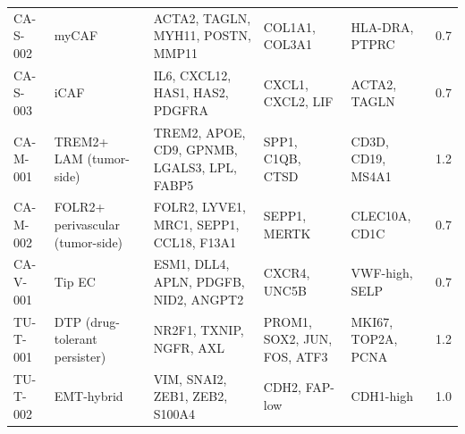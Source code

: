 \begin{longtable}{@{}l l p{42mm} p{38mm} p{34mm} l@{}}
CA-S-002 & myCAF                               & ACTA2, TAGLN, MYH11, POSTN, MMP11          & COL1A1, COL3A1                                 & HLA-DRA, PTPRC                                 & 0.7 \\
CA-S-003 & iCAF                                & IL6, CXCL12, HAS1, HAS2, PDGFRA            & CXCL1, CXCL2, LIF                              & ACTA2, TAGLN                                   & 0.7 \\
CA-M-001 & TREM2+ LAM (tumor-side)             & TREM2, APOE, CD9, GPNMB, LGALS3, LPL, FABP5 & SPP1, C1QB, CTSD                              & CD3D, CD19, MS4A1                              & 1.2 \\
CA-M-002 & FOLR2+ perivascular (tumor-side)    & FOLR2, LYVE1, MRC1, SEPP1, CCL18, F13A1    & SEPP1, MERTK                                    & CLEC10A, CD1C                                  & 0.7 \\
CA-V-001 & Tip EC                              & ESM1, DLL4, APLN, PDGFB, NID2, ANGPT2      & CXCR4, UNC5B                                   & VWF-high, SELP                                 & 0.7 \\
TU-T-001 & DTP (drug-tolerant persister)       & NR2F1, TXNIP, NGFR, AXL                    & PROM1, SOX2, JUN, FOS, ATF3                    & MKI67, TOP2A, PCNA                             & 1.2 \\
TU-T-002 & EMT-hybrid                          & VIM, SNAI2, ZEB1, ZEB2, S100A4             & CDH2, FAP-low                                  & CDH1-high                                      & 1.0 \\
\end{longtable}
